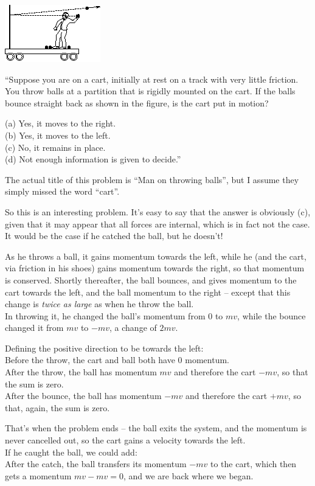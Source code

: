 \documentclass[12pt,a4paper]{report}
\begin{document}
\begin{center}
\includegraphics[scale=0.8]{Graphics/h6p8}
\end{center}

``Suppose you are on a cart, initially at rest on a track with very little friction. You throw balls at a partition that is rigidly mounted on the cart. If the balls bounce straight back as shown in the figure, is the cart put in motion?

(a) Yes, it moves to the right.\\
(b) Yes, it moves to the left.\\
(c) No, it remains in place.\\
(d) Not enough information is given to decide.''

The actual title of this problem is ``Man on throwing balls'', but I assume they simply missed the word ``cart''.

So this is an interesting problem. It's easy to say that the answer is obviously (c), given that it may appear that all forces are internal, which is in fact not the case. It would be the case if he catched the ball, but he doesn't!

As he throws a ball, it gains momentum towards the left, while he (and the cart, via friction in his shoes) gains momentum towards the right, so that momentum is conserved. Shortly thereafter, the ball bounces, and gives momentum to the cart towards the left, and the ball momentum to the right -- except that this change is \emph{twice as large} as when he throw the ball.\\
In throwing it, he changed the ball's momentum from $0$ to $m v$, while the bounce changed it from $m v$ to $-m v$, a change of $2 m v$. 

Defining the positive direction to be towards the left:\\
Before the throw, the cart and ball both have 0 momentum.\\
After the throw, the ball has momentum $m v$ and therefore the cart $- m v$, so that the sum is zero.\\
After the bounce, the ball has momentum $- m v$ and therefore the cart $+ m v$, so that, again, the sum is zero.

That's when the problem ends -- the ball exits the system, and the momentum is never cancelled out, so the cart gains a velocity towards the left.\\
If he caught the ball, we could add:\\
After the catch, the ball transfers its momentum $- m v$ to the cart, which then gets a momentum $m v - m v = 0$, and we are back where we began.
\end{document}
